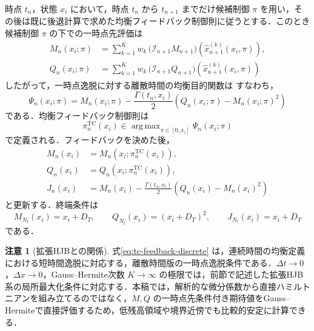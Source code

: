 \documentclass[10pt,a4paper]{article}
\theoremstyle{plain}
\theoremstyle{definition}
\newtheorem{remark}{注意}
\DeclareMathOperator*{\argmax}{arg\,max}
\begin{document}
時点 $t_n$，状態 $x_i$ において，時点 $t_n$ から $t_{n+1}$ までだけ候補制御 $\pi$ を用い，その後は既に後退計算で求めた均衡フィードバック制御則に従うとする．このとき候補制御 $\pi$ の下での一時点先評価は
\begin{align}
  M_n(x_i;\pi)
  &=\sum_{k=1}^K w_k\,
  \bigl(\mathcal I_{n+1}M_{n+1}\bigr)
  \left(\widehat{x}_{n+1}^{(k)}(x_i,\pi)\right),
  \label{eq:Mpi-gh}\\
  Q_n(x_i;\pi)
  &=\sum_{k=1}^K w_k\,
  \bigl(\mathcal I_{n+1}Q_{n+1}\bigr)
  \left(\widehat{x}_{n+1}^{(k)}(x_i,\pi)\right)
  \label{eq:Qpi-gh}
\end{align}
したがって，一時点逸脱に対する離散時間の均衡目的関数は
すなわち，
\begin{equation}
  \Psi_n(x_i;\pi)
  =M_n(x_i;\pi)
  -\frac{\Gamma(t_n,x_i)}{2}
  \left(Q_n(x_i;\pi)-M_n(x_i;\pi)^2\right)
  \label{eq:Psi-pi-clean}
\end{equation}
である．均衡フィードバック制御則は
\begin{equation}
  \pi_n^{\mathrm{TC}}(x_i)
  \in\argmax_{\pi\in[0,x_i]}\Psi_n(x_i;\pi)
  \label{eq:tc-feedback-discrete}
\end{equation}
で定義される．フィードバックを決めた後，
\begin{align}
  M_n(x_i)&=M_n\!\left(x_i;\pi_n^{\mathrm{TC}}(x_i)\right),
  \label{eq:M-update-TC}\\
  Q_n(x_i)&=Q_n\!\left(x_i;\pi_n^{\mathrm{TC}}(x_i)\right),
  \label{eq:Q-update-TC}\\
  J_n(x_i)&=M_n(x_i)-\frac{\Gamma(t_n,x_i)}{2}
  \left(Q_n(x_i)-M_n(x_i)^2\right)
  \label{eq:J-update-TC}
\end{align}
と更新する．終端条件は
\begin{equation}
  M_{N_t}(x_i)=x_i+D_T,
  \qquad Q_{N_t}(x_i)=(x_i+D_T)^2,
  \qquad J_{N_t}(x_i)=x_i+D_T
  \label{eq:tc-terminal}
\end{equation}
である．

\begin{remark}[拡張HJBとの関係]
式\eqref{eq:tc-feedback-discrete} は，連続時間の均衡定義における短時間逸脱に対応する，離散時間版の一時点逸脱条件である．$\Delta t\to0$，$\Delta x\to0$，Gauss--Hermite次数 $K\to\infty$ の極限では，前節で記述した拡張HJB系の局所最大化条件に対応する．本稿では，解析的な微分係数から直接ハミルトニアンを組み立てるのではなく，$M,Q$ の一時点先条件付き期待値をGauss--Hermiteで直接評価するため，低残高領域や境界近傍でも比較的安定に計算できる．
\end{remark}
\end{document}
